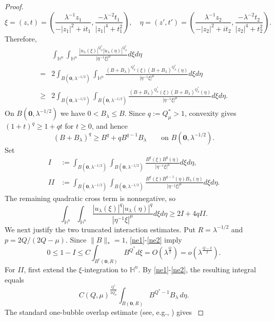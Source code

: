 \documentclass[10pt,a4paper]{amsart}
\begin{document}
\begin{proof}
\begin{equation*}
 \xi= (z,t)=\left(\frac{\lambda^{-1}z_1}{-|z_1|^2+it_1},\frac{-\lambda^{-2}t_1}{|z_1|^4+t_1^2}\right),\quad
 \eta= (z',t')=\left(\frac{\lambda^{-1}z_2}{-|z_2|^2+it_2},\frac{-\lambda^{-2}t_2}{|z_2|^4+t_2^2}\right).
\end{equation*}
{Therefore,
\begin{align*}
 &\int_{\mathbb{H}^{n}}\int_{\mathbb{H}^{n}}\frac{|u_\lambda(\xi)|^{Q^{\ast}_{\mu}}|u_\lambda(\eta)|
 ^{Q^{\ast}_{\mu}}}{|\eta^{-1}\xi|^{\mu}}{d}\xi{d}\eta\\
 =&2\int_{B(\mathbf{0},\lambda^{-1/2})}\int_{\mathbb{H}^{n}}\frac{(B+B_\lambda)^{Q^{\ast}_{\mu}}(\xi)
 (B+B_\lambda)^{Q^{\ast}_{\mu}}(\eta)}{|\eta^{-1}\xi|^{\mu}}{d}\xi{d}\eta\\
 \geq&2\int_{B(\mathbf{0},\lambda^{-1/2})}\int_{B(\mathbf{0},\lambda^{-1/2})}\frac{(B+B_\lambda)^{Q^{\ast}_{\mu}}(\xi)
 (B+B_\lambda)^{Q^{\ast}_{\mu}}(\eta)}{|\eta^{-1}\xi|^{\mu}}{d}\xi{d}\eta.
\end{align*}
On $B(\mathbf{0},\lambda^{-1/2})$ we have $0<B_\lambda\leq B$. Since $q:=Q^{\ast}_{\mu}>1$, convexity gives $(1+t)^q\geq1+qt$ for $t\geq0$, and hence
\[
 (B+B_\lambda)^q\geq B^q+qB^{q-1}B_\lambda
 \qquad\text{on }B(\mathbf{0},\lambda^{-1/2}).
\]
Set
\begin{align*}
 I&:=\int_{B(\mathbf{0},\lambda^{-1/2})}\int_{B(\mathbf{0},\lambda^{-1/2})}
 \frac{B^q(\xi)B^q(\eta)}{|\eta^{-1}\xi|^\mu}{d}\xi{d}\eta,\\
 II&:=\int_{B(\mathbf{0},\lambda^{-1/2})}\int_{B(\mathbf{0},\lambda^{-1/2})}
 \frac{B^q(\xi)B^{q-1}(\eta)B_\lambda(\eta)}{|\eta^{-1}\xi|^\mu}{d}\xi{d}\eta.
\end{align*}
The remaining quadratic cross term is nonnegative, so
\begin{equation}\label{two-bubble-HLS-lower}
 \int_{\mathbb{H}^{n}}\int_{\mathbb{H}^{n}}\frac{|u_\lambda(\xi)|^q|u_\lambda(\eta)|^q}{|\eta^{-1}\xi|^\mu}{d}\xi{d}\eta
 \geq 2I+4qII.
\end{equation}
We next justify the two truncated interaction estimates. Put $R=\lambda^{-1/2}$ and
$p=2Q/(2Q-\mu)$. Since $\|B\|_*=1$, \eqref{ne1}-\eqref{ne2} imply
\[
 0\leq1-I\leq C\int_{B^c(\mathbf0,R)}B^{Q^{\ast}}d\xi
 =O\left(\lambda^{\frac{Q}{2}}\right)
 =o\!\left(\lambda^{\frac{Q-2}{2}}\right).
\]
For $II$, first extend the $\xi$-integration to $\mathbb H^n$. By \eqref{ne1}-\eqref{ne2}, the resulting integral equals
\[
 C(Q,\mu)^{\frac{Q^{\ast}}{2Q^{\ast}_{\mu}}}
 \int_{B(\mathbf0,R)}B^{Q^{\ast}-1}B_\lambda\,d\eta.
\]
The standard one-bubble overlap estimate (see, e.g., \cite[Proposition~3.1]{K25}) gives
}
\end{proof}
\end{document}
